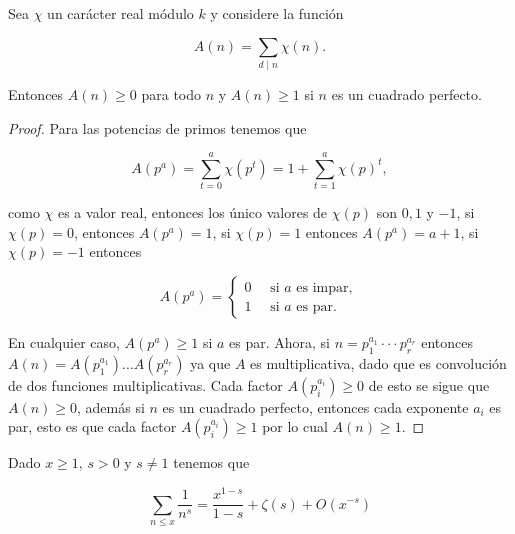 \begin{theorem}
Sea $\chi$ un carácter real módulo $k$ y considere la función

$$A(n)=\sum_{d\mid n} \chi(n).$$

Entonces $A(n)\geq 0$ para todo $n$ y $A(n)\geq 1$ si $n$ es un cuadrado perfecto.
\end{theorem}

\begin{proof}
Para las potencias de primos tenemos que

$$A(p^a)=\sum_{t=0}^{a}\chi(p^t)=1+\sum_{t=1}^{a} \chi(p)^t,$$

como $\chi$ es a valor real, entonces los único valores de $\chi(p)$  son $0,1$ y $-1$, si $\chi(p)=0$, entonces $A(p^a)=1$, si $\chi(p)=1$ entonces $A(p^a)=a+1$, si $\chi(p)=-1$ entonces

$$A(p^a)=\begin{cases}
0 \quad\text{ si } a \text{ es impar},\\
1 \quad\text{ si } a \text{ es par}.
\end{cases}$$

En cualquier caso, $A(p^a)\geq 1$ si $a$ es par. Ahora, si $n=p_1^{a_1}\cdot\cdot\cdot p_r^{a_r}$ entonces $A(n)=A(p_1^{a_1})\ldots A(p_r^{a_r})$ ya que $A$ es multiplicativa, dado que es convolución de dos funciones multiplicativas. Cada factor $A(p_i^{a_i})\geq 0$ de esto se sigue que $A(n)\geq 0$, además si $n$ es un cuadrado perfecto, entonces cada exponente $a_i$ es par, esto es que cada factor $A(p_i^{a_i})\geq 1$ por lo cual $A(n)\geq 1$.
\end{proof}


\begin{lemma}
Dado $x\geq 1$, $s>0$ y $s\neq 1$ tenemos que

$$
\sum_{n \leq x} \frac{1}{n^s}=\frac{x^{1-s}}{1-s}+\zeta(s)+O\left(x^{-s}\right)
$$
\end{lemma}

